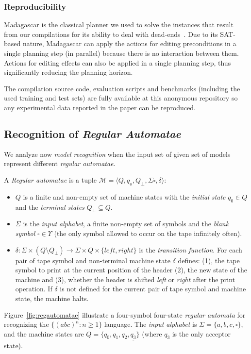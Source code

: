 \documentclass[letterpaper]{article} %
\newcommand{\tup}[1]{{\langle #1 \rangle}}
\begin{document}
\subsubsection{Reproducibility}
{\sc Madagascar} is the classical planner we used to solve the instances that result from our compilations for its ability to deal with dead-ends~\cite{rintanen2014madagascar}. Due to its SAT-based nature, {\sc Madagascar} can apply the actions for editing preconditions in a single planning step (in parallel) because there is no interaction between them. Actions for editing effects can also be applied in a single planning step, thus significantly reducing the planning horizon.

The compilation source code, evaluation scripts and benchmarks (including the used training and test sets) are fully available at this anonymous repository {\em } so any experimental data reported in the paper can be reproduced.

\subsection{Recognition of {\em Regular Automatae}}
We analyze now {\em model recognition} when the input set of given set of models represent different {\em regular automatae}.

A {\em Regular automatae} is a tuple $\mathcal{M}=\tup{Q,q_o,Q_{\bot},\Sigma\square,\delta}$:
\begin{itemize}
\item $Q$ is a finite and non-empty set of machine states with the {\em initial state} $q_0\in Q$ and the {\em terminal states} $Q_{\bot}\subseteq Q$.  
\item $\Sigma$ is the {\em input alphabet}, a finite non-empty set of symbols and the {\em blank symbol} $\square\in\Upsilon$ (the only symbol allowed to occur on the tape infinitely often).
\item $\delta: \Sigma\times (Q\setminus Q_{\bot}) \rightarrow \Sigma\times Q\times\{left,right\}$ is the {\em transition function}. For each pair of tape symbol and non-terminal machine state $\delta$ defines: (1), the tape symbol to print at the current position of the header (2), the new state of the machine and (3), whether the header is shifted {\em left} or {\em right} after the print operation. If $\delta$ is not defined for the current pair of tape symbol and machine state, the machine halts.
\end{itemize}

Figure~\ref{fig:regautomatae} illustrate a four-symbol four-state {\em regular automata} for recognizing the $\{(abc)^n : n \geq 1 \}$ language. The {\em input alphabet} is $\Sigma=\{a,b,c,\square\}$, and the machine states are $Q=\{q_0,q_1,q_2,\underline{q_3}\}$ (where \underline{$q_3$} is the only acceptor state).
\end{document}
